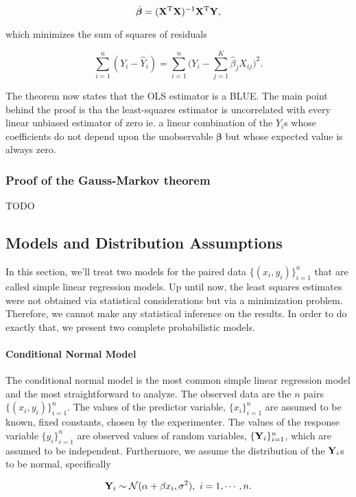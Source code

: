 \documentclass{homework}
\begin{document}
$$
\hat{{\bm \beta}} = ({\bf X}^{\textnormal{T}} {\bf X})^{-1} {\bf X}^{\textnormal{T}} {\bf Y},
$$

which minimizes the sum of squares of residuals 

$$
\sum_{i=1}^{n} (Y_{i} - \hat{Y}_i) = \sum_{i=1}^{n} \bigg(Y_i - \sum_{j=1}^{K} \hat{\beta}_j X_{ij} \bigg)^2.
$$

The theorem now states that the OLS estimator is a BLUE. The main point behind the proof is tha the least-squares estimator is uncorrelated with every linear unbiased estimator of zero ie. a linear combination of the $Y_i$s whose coefficients do not depend upon the unobservable $\bm \beta$ but whose expected value is always zero.

\subsubsection{Proof of the Gauss-Markov theorem} TODO

\subsection{Models and Distribution Assumptions}

In this section, we'll treat two models for the paired data $\{(x_i, y_i)\}_{i=1}^n$ that are called simple linear regression models. Up until now, the least squares estimates were not obtained via statistical considerations but via a minimization problem. Therefore, we cannot make any statistical inference on the results. In order to do exactly that, we present two complete probabilistic models. \\

\paragraph{\textbf{Conditional Normal Model}} 

The conditional normal model is the most common simple linear regression model and the most straightforward to analyze. The observed data are the $n$ pairs $\{(x_i, y_i)\}_{i=1}^n$. The values of the predictor variable, $\{x_i\}_{i=1}^n$ are assumed to be known, fixed constants, chosen by the experimenter. The values of the response variable $\{y_i\}_{i=1}^n$ are observed values of random variables, $\{{\bf Y}_i\}_{i=1}^n$, which are assumed to be independent. Furthermore, we assume the distribution of the ${\bf Y}_i$s to be normal, specifically

\begin{equation}
    {\bf Y}_i \sim \mathcal{N}(\alpha+\beta x_i, \sigma^2), \textnormal{ } i = 1, \cdots, n.
\end{equation}
\end{document}
